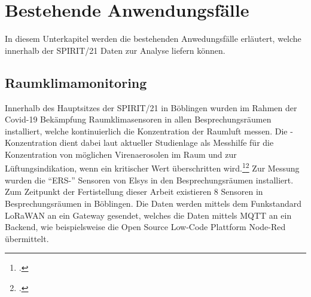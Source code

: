 \section{Bestehende Anwendungsfälle}
In diesem Unterkapitel werden die bestehenden Anwedungsfälle erläutert, welche innerhalb der SPIRIT/21 Daten zur Analyse liefern können.

\subsection{Raumklimamonitoring}
Innerhalb des Hauptsitzes der SPIRIT/21 in Böblingen wurden im Rahmen der Covid-19 Bekämpfung Raumklimasensoren in allen Besprechungsräumen installiert, welche kontinuierlich die \coo{} Konzentration der Raumluft messen. Die \coo{}-Konzentration dient dabei laut aktueller Studienlage als Messhilfe für die Konzentration von möglichen Virenaerosolen im Raum und zur Lüftungsindikation, wenn ein kritischer Wert überschritten wird.\footcite[Vgl.][]{Hartmann.2020}\nzitat\footcite[Vgl.][]{Peng.2020} Zur Messung wurden die \enquote{ERS-\coo{}} Sensoren von Elsys in den Besprechungsräumen installiert. Zum Zeitpunkt der Fertistellung dieser Arbeit existieren 8 Sensoren in Besprechungsräumen in Böblingen. Die Daten werden mittels dem Funkstandard \ac{LoRaWAN} an ein Gateway gesendet, welches die Daten mittels \ac{MQTT} an ein Backend, wie beispielsweise die Open Source Low-Code Plattform Node-Red übermittelt. 

